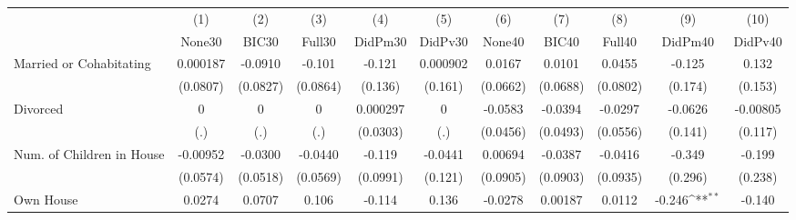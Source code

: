 {
\def\sym#1{\ifmmode^{#1}\else\(^{#1}\)\fi}
\begin{tabular}{l*{10}{c}}
\toprule
            &\multicolumn{1}{c}{(1)}&\multicolumn{1}{c}{(2)}&\multicolumn{1}{c}{(3)}&\multicolumn{1}{c}{(4)}&\multicolumn{1}{c}{(5)}&\multicolumn{1}{c}{(6)}&\multicolumn{1}{c}{(7)}&\multicolumn{1}{c}{(8)}&\multicolumn{1}{c}{(9)}&\multicolumn{1}{c}{(10)}\\
            &\multicolumn{1}{c}{None30}&\multicolumn{1}{c}{BIC30}&\multicolumn{1}{c}{Full30}&\multicolumn{1}{c}{DidPm30}&\multicolumn{1}{c}{DidPv30}&\multicolumn{1}{c}{None40}&\multicolumn{1}{c}{BIC40}&\multicolumn{1}{c}{Full40}&\multicolumn{1}{c}{DidPm40}&\multicolumn{1}{c}{DidPv40}\\
\midrule
Married or Cohabitating&    0.000187         &     -0.0910         &      -0.101         &      -0.121         &    0.000902         &      0.0167         &      0.0101         &      0.0455         &      -0.125         &       0.132         \\
            &    (0.0807)         &    (0.0827)         &    (0.0864)         &     (0.136)         &     (0.161)         &    (0.0662)         &    (0.0688)         &    (0.0802)         &     (0.174)         &     (0.153)         \\
\addlinespace
Divorced    &           0         &           0         &           0         &    0.000297         &           0         &     -0.0583         &     -0.0394         &     -0.0297         &     -0.0626         &    -0.00805         \\
            &         (.)         &         (.)         &         (.)         &    (0.0303)         &         (.)         &    (0.0456)         &    (0.0493)         &    (0.0556)         &     (0.141)         &     (0.117)         \\
\addlinespace
Num. of Children in House&    -0.00952         &     -0.0300         &     -0.0440         &      -0.119         &     -0.0441         &     0.00694         &     -0.0387         &     -0.0416         &      -0.349         &      -0.199         \\
            &    (0.0574)         &    (0.0518)         &    (0.0569)         &    (0.0991)         &     (0.121)         &    (0.0905)         &    (0.0903)         &    (0.0935)         &     (0.296)         &     (0.238)         \\
\addlinespace
Own House   &      0.0274         &      0.0707         &       0.106         &      -0.114         &       0.136         &     -0.0278         &     0.00187         &      0.0112         &      -0.246\sym{**} &      -0.140         \\

\end{tabular}}
